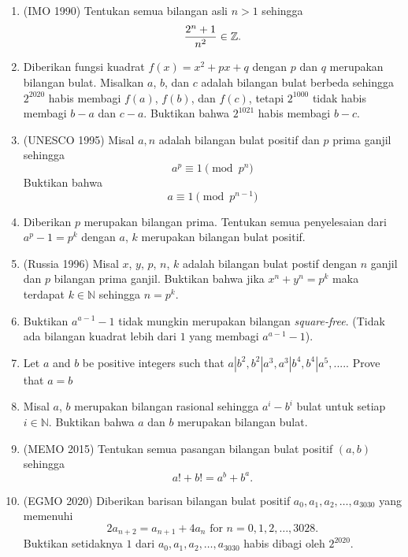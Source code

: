 \documentclass[12pt]{scrartcl}
\begin{document}
\begin{enumerate}[resume]
    \item (IMO 1990) Tentukan semua bilangan asli $n > 1$ sehingga 
    \begin{align*}
        \dfrac{2^n+1}{n^2} \in \mathbb Z.
    \end{align*}
    
    \item  Diberikan fungsi kuadrat $f(x) = x^2 + px + q$ dengan $p$ dan $q$ merupakan bilangan bulat. Misalkan $a$, $b$, dan $c$ adalah bilangan bulat berbeda sehingga $2^2020$ habis membagi $f(a)$, $f(b)$, dan $f(c)$, tetapi $2^1000$ tidak habis membagi $b-a$ dan $c-a$. Buktikan bahwa $2^1021$ habis membagi $b-c$.
    
    \item (UNESCO 1995) Misal $a,n$ adalah bilangan bulat positif dan $p$ prima ganjil sehingga $$a^p \equiv 1 \pmod{p^n}$$ Buktikan bahwa $$a \equiv 1 \pmod{p^{n-1}}$$ 
    
    \item  Diberikan $p$ merupakan bilangan prima. Tentukan semua penyelesaian dari $a^p - 1 = p^k$ dengan $a$, $k$ merupakan bilangan bulat positif.
    
    \item (Russia 1996)  Misal $x$, $y$, $p$, $n$, $k$ adalah bilangan bulat postif dengan $n$ ganjil dan $p$ bilangan prima ganjil. Buktikan bahwa jika $x^n + y^n = p^k$ maka terdapat $k\in\mathbb{N}$ sehingga $n=p^k$. 
    
    \item  Buktikan $a^{a-1} - 1$ tidak mungkin merupakan bilangan \textit{square-free}. (Tidak ada bilangan kuadrat lebih dari $1$ yang membagi $a^{a-1} - 1$).
    
    \item Let $a$ and $b$ be positive integers such that $a|b^2,b^2|a^3,a^3|b^4,b^4|a^5,....$. Prove that $a=b$
    
    \item  Misal $a$, $b$ merupakan bilangan rasional sehingga $a^i - b^i$ bulat untuk setiap $i \in \mathbb{N}$. Buktikan bahwa $a$ dan $b$ merupakan bilangan bulat.
    
    \item (MEMO 2015) Tentukan semua pasangan bilangan bulat positif $(a,b)$ sehingga
    $$a!+b!=a^b + b^a.$$ 
    
    \item (EGMO 2020) Diberikan barisan bilangan bulat positif $a_0, a_1, a_2, \ldots, a_{3030}$ yang memenuhi $$2a_{n + 2} = a_{n + 1} + 4a_n \text{ for } n = 0, 1, 2, \ldots, 3028.$$
    Buktikan setidaknya $1$ dari $a_0, a_1, a_2, \ldots, a_{3030}$ habis dibagi oleh $2^{2020}$. 
    

\end{enumerate}
\end{document}
